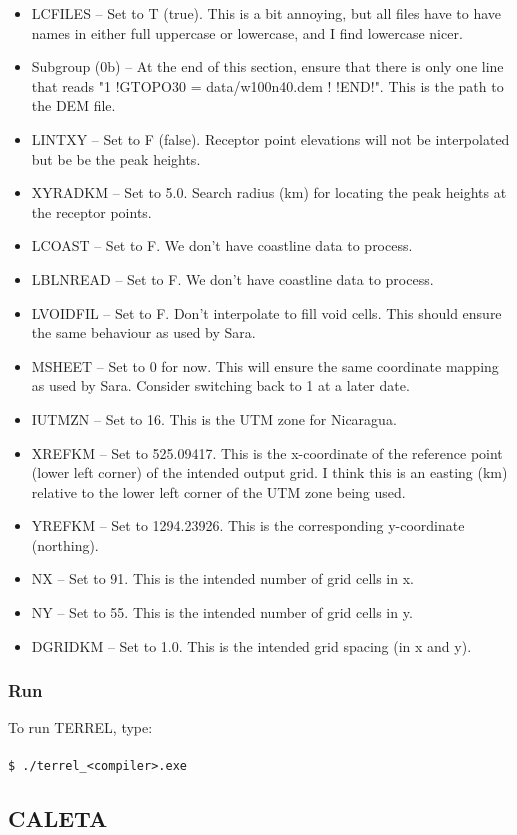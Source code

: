 \documentclass[10pt,a4paper]{article}
\newcommand\tab[1][0.5cm]{\hspace*{#1}}
\begin{document}
\begin{itemize}
\begin{itemize}
\item LCFILES -- Set to T (true). This is a bit annoying, but all files have to have names in either full uppercase or lowercase, and I find lowercase nicer.
\item Subgroup (0b) -- At the end of this section, ensure that there is only one line that reads "1 !GTOPO30 = data/w100n40.dem !     !END!". This is the path to the DEM file.
\item LINTXY -- Set to F (false). Receptor point elevations will not be interpolated but be be the peak heights.
\item XYRADKM -- Set to 5.0. Search radius (km) for locating the peak heights at the receptor points.
\item LCOAST -- Set to F. We don't have coastline data to process.
\item LBLNREAD -- Set to F. We don't have coastline data to process.
\item LVOIDFIL -- Set to F. Don't interpolate to fill void cells. This should ensure the same behaviour as used by Sara.
\item MSHEET -- Set to 0 for now. This will ensure the same coordinate mapping as used by Sara. Consider switching back to 1 at a later date.
\item IUTMZN -- Set to 16. This is the UTM zone for Nicaragua.
\item XREFKM -- Set to 525.09417. This is the x-coordinate of the reference point (lower left corner) of the intended output grid. I think this is an easting (km) relative to the lower left corner of the UTM zone being used.
\item YREFKM -- Set to 1294.23926. This is the corresponding y-coordinate (northing).
\item NX -- Set to 91. This is the intended number of grid cells in x.
\item NY -- Set to 55. This is the intended number of grid cells in y.
\item DGRIDKM -- Set to 1.0. This is the intended grid spacing (in x and y).
\end{itemize}
\end{itemize}
\subsubsection{Run}
To run TERREL, type:\\\\
\tab \texttt{\$ ./terrel\_<compiler>.exe}


\subsection{CALETA}
\end{document}
